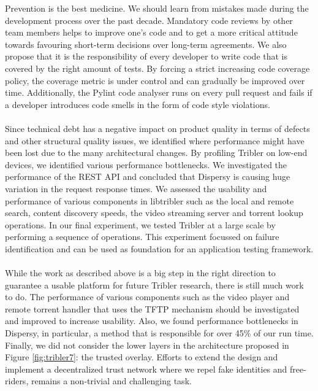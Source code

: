 Prevention is the best medicine. We should learn from mistakes made during the development process over the past decade. Mandatory code reviews by other team members helps to improve one's code and to get a more critical attitude towards favouring short-term decisions over long-term agreements. We also propose that it is the responsibility of every developer to write code that is covered by the right amount of tests. By forcing a strict increasing code coverage policy, the coverage metric is under control and can gradually be improved over time. Additionally, the Pylint code analyser runs on every pull request and fails if a developer introduces code smells in the form of code style violations.\\\\
Since technical debt has a negative impact on product quality in terms of defects and other structural quality issues, we identified where performance might have been lost due to the many architectural changes. By profiling Tribler on low-end devices, we identified various performance bottlenecks. We investigated the performance of the REST API and concluded that Dispersy is causing huge variation in the request response times. We assessed the usability and performance of various components in libtribler such as the local and remote search, content discovery speeds, the video streaming server and torrent lookup operations. In our final experiment, we tested Tribler at a large scale by performing a sequence of operations. This experiment focussed on failure identification and can be used as foundation for an application testing framework.\\\\
While the work as described above is a big step in the right direction to guarantee a usable platform for future Tribler research, there is still much work to do. The performance of various components such as the video player and remote torrent handler that uses the TFTP mechanism should be investigated and improved to increase usability. Also, we found performance bottlenecks in Dispersy, in particular, a method that is responsible for over 45\% of our run time. Finally, we did not consider the lower layers in the architecture proposed in Figure \ref{fig:tribler7}: the trusted overlay. Efforts to extend the design and implement a decentralized trust network where we repel fake identities and free-riders, remains a non-trivial and challenging task.

